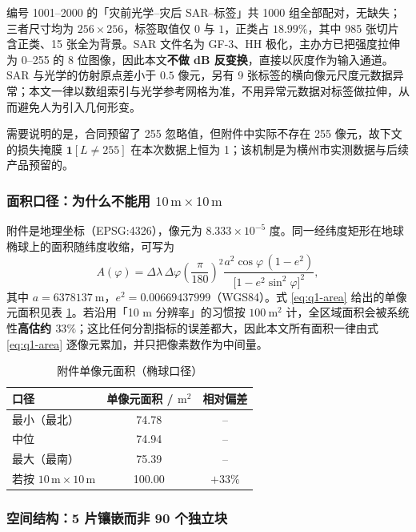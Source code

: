 编号 1001--2000 的「灾前光学--灾后 SAR--标签」共 1000 组全部配对，无缺失；三者尺寸均为 $256\times256$，标签取值仅 $0$ 与 $1$，正类占 $18.99\%$，其中 985 张切片含正类、15 张全为背景。SAR 文件名为 GF-3、HH 极化，主办方已把强度拉伸为 0--255 的 8 位图像，因此本文\textbf{不做 dB 反变换}，直接以灰度作为输入通道。SAR 与光学的仿射原点差小于 $0.5$ 像元，另有 9 张标签的横向像元尺度元数据异常；本文一律以数组索引与光学参考网格为准，不用异常元数据对标签做拉伸，从而避免人为引入几何形变。

需要说明的是，合同预留了 255 忽略值，但附件中实际不存在 255 像元，故下文的损失掩膜 $\mathbf{1}[L\ne255]$ 在本次数据上恒为 1；该机制是为横州市实测数据与后续产品预留的。

\subsubsection{面积口径：为什么不能用 $10\,\mathrm{m}\times10\,\mathrm{m}$}

附件是地理坐标（EPSG:4326），像元为 $8.333\times10^{-5}$ 度。同一经纬度矩形在地球椭球上的面积随纬度收缩，可写为
\begin{equation}
A(\varphi)=\Delta\lambda\,\Delta\varphi\left(\frac{\pi}{180}\right)^{2}
\frac{a^{2}\cos\varphi\,(1-e^{2})}{\big[1-e^{2}\sin^{2}\varphi\big]^{2}},
\label{eq:q1-area}
\end{equation}
其中 $a=6378137\ \mathrm{m}$，$e^{2}=0.00669437999$（WGS84）。式 \eqref{eq:q1-area} 给出的单像元面积见表 \ref{tab:q1-pixel}。若沿用「10 m 分辨率」的习惯按 $100\ \mathrm{m^2}$ 计，全区域面积会被系统性\textbf{高估约 $33\%$}；这比任何分割指标的误差都大，因此本文所有面积一律由式 \eqref{eq:q1-area} 逐像元累加，并只把像素数作为中间量。

\begin{table}[H]
\centering
\caption{附件单像元面积（椭球口径）}
\label{tab:q1-pixel}
\begin{tabular}{lcc}
\toprule
口径 & 单像元面积 / $\mathrm{m^2}$ & 相对偏差 \\
\midrule
最小（最北） & 74.78 & -- \\
中位         & 74.94 & -- \\
最大（最南） & 75.39 & -- \\
\multicolumn{1}{l}{若按 $10\,\mathrm{m}\times10\,\mathrm{m}$} & 100.00 & $+33\%$ \\
\bottomrule
\end{tabular}
\end{table}

\subsubsection{空间结构：5 片镶嵌而非 90 个独立块}
\label{sec:q1-layout}

